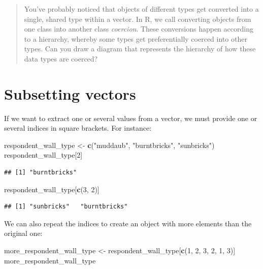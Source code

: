 \documentclass[]{book}
\newenvironment{Shaded}{\begin{snugshade}}{\end{snugshade}}
\newcommand{\KeywordTok}[1]{\textcolor[rgb]{0.13,0.29,0.53}{\textbf{#1}}}
\newcommand{\DecValTok}[1]{\textcolor[rgb]{0.00,0.00,0.81}{#1}}
\newcommand{\StringTok}[1]{\textcolor[rgb]{0.31,0.60,0.02}{#1}}
\newcommand{\NormalTok}[1]{#1}
\begin{document}
\begin{quote}
You've probably noticed that objects of different types get converted
into a single, shared type within a vector. In R, we call converting
objects from one class into another class \emph{coercion}. These
conversions happen according to a hierarchy, whereby some types get
preferentially coerced into other types. Can you draw a diagram that
represents the hierarchy of how these data types are coerced?
\end{quote}

\section{Subsetting vectors}\label{subsetting-vectors}

If we want to extract one or several values from a vector, we must
provide one or several indices in square brackets. For instance:

\begin{Shaded}
\begin{Highlighting}[]
\NormalTok{respondent_wall_type <-}\StringTok{ }\KeywordTok{c}\NormalTok{(}\StringTok{"muddaub"}\NormalTok{, }\StringTok{"burntbricks"}\NormalTok{, }\StringTok{"sunbricks"}\NormalTok{)}
\NormalTok{respondent_wall_type[}\DecValTok{2}\NormalTok{]}
\end{Highlighting}
\end{Shaded}

\begin{verbatim}
## [1] "burntbricks"
\end{verbatim}

\begin{Shaded}
\begin{Highlighting}[]
\NormalTok{respondent_wall_type[}\KeywordTok{c}\NormalTok{(}\DecValTok{3}\NormalTok{, }\DecValTok{2}\NormalTok{)]}
\end{Highlighting}
\end{Shaded}

\begin{verbatim}
## [1] "sunbricks"   "burntbricks"
\end{verbatim}

We can also repeat the indices to create an object with more elements
than the original one:

\begin{Shaded}
\begin{Highlighting}[]
\NormalTok{more_respondent_wall_type <-}\StringTok{ }\NormalTok{respondent_wall_type[}\KeywordTok{c}\NormalTok{(}\DecValTok{1}\NormalTok{, }\DecValTok{2}\NormalTok{, }\DecValTok{3}\NormalTok{, }\DecValTok{2}\NormalTok{, }\DecValTok{1}\NormalTok{, }\DecValTok{3}\NormalTok{)]}
\NormalTok{more_respondent_wall_type}
\end{Highlighting}
\end{Shaded}
\end{document}
